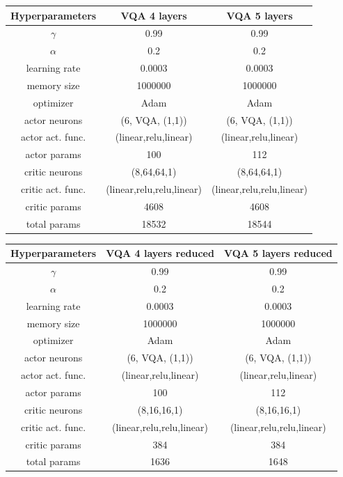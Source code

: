 \newline
\vspace{0.2cm}
\newline
\begin{tabular}{|c|c|c|}
	\hline
	Hyperparameters & VQA 4 layers & VQA 5 layers  \\
	\hline
	$\gamma$ & 0.99 & 0.99  \\
	\hline
	$\alpha$ & 0.2 & 0.2  \\
	\hline
	learning rate & 0.0003 & 0.0003  \\
	\hline
	memory size & 1000000 & 1000000   \\
	\hline
	optimizer & Adam & Adam  \\
	\hline
	actor neurons  & (6, VQA, (1,1)) & (6, VQA, (1,1))  \\
	\hline
	actor act. func. & (linear,relu,linear) & (linear,relu,linear) \\
	\hline
	actor params & 100 & 112 \\
	\hline
	critic neurons & (8,64,64,1) & (8,64,64,1)  \\
	\hline
	critic act. func. & (linear,relu,relu,linear) & (linear,relu,relu,linear) \\
	\hline
	critic params & 4608 & 4608 \\
	\hline
	total params & 18532 & 18544 \\
	\hline
\end{tabular}
\newline
\vspace{0.5 cm}
\newline\begin{tabular}{|c|c|c|}
	\hline
	Hyperparameters & VQA 4 layers reduced & VQA 5 layers reduced  \\
	\hline
	$\gamma$ & 0.99 & 0.99   \\
	\hline
	$\alpha$ & 0.2 & 0.2   \\
	\hline
	learning rate & 0.0003 & 0.0003   \\
	\hline
	memory size & 1000000 & 1000000   \\
	\hline
	optimizer & Adam & Adam  \\
	\hline
	actor neurons  & (6, VQA, (1,1)) & (6, VQA, (1,1))  \\
	\hline
	actor act. func. & (linear,relu,linear) & (linear,relu,linear) \\
	\hline
	actor params & 100 & 112  \\
	\hline
	critic neurons & (8,16,16,1) & (8,16,16,1)  \\
	\hline
	critic act. func. & (linear,relu,relu,linear) & (linear,relu,relu,linear) \\
	\hline
	critic params & 384 & 384\\
	\hline
	total params & 1636 & 1648\\
	\hline
\end{tabular}
